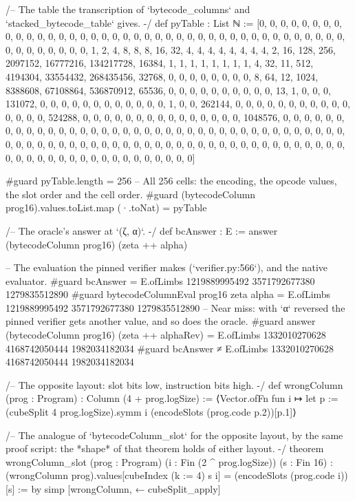 \begin{leancode}
/-- The table the transcription of `bytecode_columns` and `stacked_bytecode_table` gives. -/
def pyTable : List ℕ :=
  [0, 0, 0, 0, 0, 0, 0, 0, 0, 0, 0, 0, 0, 0, 0, 0, 0, 0, 0, 0, 0, 0, 0, 0, 0, 0, 0, 0, 0, 0, 0, 0, 0, 0, 0, 0, 0, 0, 0, 0, 0, 0, 0, 0, 0, 0, 0, 0, 1, 2, 4, 8, 8, 8, 16, 32, 4, 4, 4, 4, 4, 4, 4, 4, 2, 16, 128, 256, 2097152, 16777216, 134217728, 16384, 1, 1, 1, 1, 1, 1, 1, 1, 4, 32, 11, 512, 4194304, 33554432, 268435456, 32768, 0, 0, 0, 0, 0, 0, 0, 0, 8, 64, 12, 1024, 8388608, 67108864, 536870912, 65536, 0, 0, 0, 0, 0, 0, 0, 0, 0, 0, 13, 1, 0, 0, 0, 131072, 0, 0, 0, 0, 0, 0, 0, 0, 0, 0, 0, 0, 1, 0, 0, 262144, 0, 0, 0, 0, 0, 0, 0, 0, 0, 0, 0, 0, 0, 0, 0, 524288, 0, 0, 0, 0, 0, 0, 0, 0, 0, 0, 0, 0, 0, 0, 0, 1048576, 0, 0, 0, 0, 0, 0, 0, 0, 0, 0, 0, 0, 0, 0, 0, 0, 0, 0, 0, 0, 0, 0, 0, 0, 0, 0, 0, 0, 0, 0, 0, 0, 0, 0, 0, 0, 0, 0, 0, 0, 0, 0, 0, 0, 0, 0, 0, 0, 0, 0, 0, 0, 0, 0, 0, 0, 0, 0, 0, 0, 0, 0, 0, 0, 0, 0, 0, 0, 0, 0, 0, 0, 0, 0, 0, 0, 0, 0, 0, 0, 0, 0, 0, 0, 0, 0, 0, 0]

#guard pyTable.length = 256
-- All 256 cells: the encoding, the opcode values, the slot order and the cell order.
#guard (bytecodeColumn prog16).values.toList.map (·.toNat) = pyTable

/-- The oracle's answer at `(ζ, α)`. -/
def bcAnswer : E := answer (bytecodeColumn prog16) (zeta ++ alpha)

-- The evaluation the pinned verifier makes (`verifier.py:566`), and the native evaluator.
#guard bcAnswer = E.ofLimbs 1219889995492 3571792677380 1279835512890
#guard bytecodeColumnEval prog16 zeta alpha = E.ofLimbs 1219889995492 3571792677380 1279835512890
-- Near miss: with `α` reversed the pinned verifier gets another value, and so does the oracle.
#guard answer (bytecodeColumn prog16) (zeta ++ alphaRev) =
  E.ofLimbs 1332010270628 4168742050444 1982034182034
#guard bcAnswer ≠ E.ofLimbs 1332010270628 4168742050444 1982034182034

/-- The opposite layout: slot bits low, instruction bits high. -/
def wrongColumn (prog : Program) : Column (4 + prog.logSize) :=
  ⟨Vector.ofFn fun i ↦
    let p := (cubeSplit 4 prog.logSize).symm i
    (encodeSlots (prog.code p.2))[p.1]⟩

/-- The analogue of `bytecodeColumn_slot` for the opposite layout, by the same proof script:
the *shape* of that theorem holds of either layout. -/
theorem wrongColumn_slot (prog : Program) (i : Fin (2 ^ prog.logSize)) (s : Fin 16) :
    (wrongColumn prog).values[cubeIndex (k := 4) s i] = (encodeSlots (prog.code i))[s] := by
  simp [wrongColumn, ← cubeSplit_apply]


\end{leancode}
